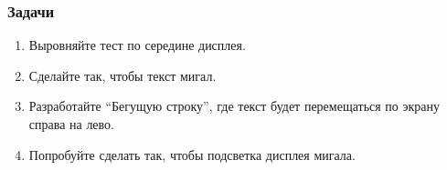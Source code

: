\documentclass[../sparc.tex]{subfiles}
\begin{document}
\subsubsection{Задачи}
\begin{enumerate}
\item Выровняйте тест по середине дисплея.
\item Сделайте так, чтобы текст мигал.
\item Разработайте ``Бегущую строку'', где текст будет перемещаться по экрану
  справа на лево.
\item Попробуйте сделать так, чтобы подсветка дисплея мигала.
\end{enumerate}
\end{document}
